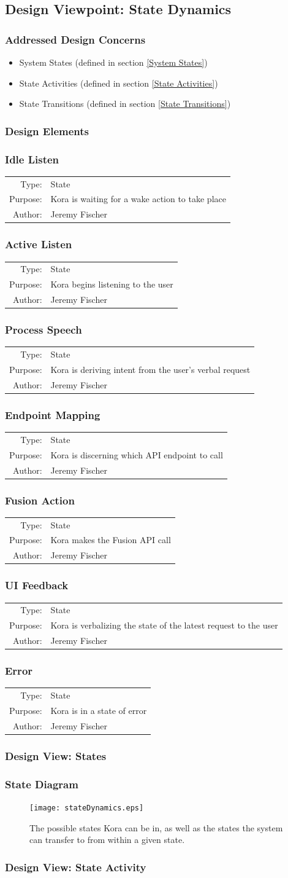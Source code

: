 \documentclass[onecolumn, draftclsnofoot,10pt, compsoc]{IEEEtran}
\def \botname{Kora\xspace}
\newcommand{\designConcernRef}[1]{
    #1 (defined in section \ref{#1})
}
\newcommand{\designElementDef}[4]{
    \subsubsection{#1}\label{#1}
        \begin{tabular}[t]{r p{6in}}
            Type: & #2 \\
            Purpose: & #3 \\
            Author: & #4 \\
        \end{tabular}
}
\begin{document}
	\subsection{Design Viewpoint: State Dynamics}
	\subsubsection{Addressed Design Concerns}
	\begin{itemize}
		\item \designConcernRef{System States}
		\item \designConcernRef{State Activities}
		\item \designConcernRef{State Transitions}
	\end{itemize}

	\subsubsection{Design Elements}
	\designElementDef{Idle Listen}{State}{\botname is waiting for a wake action to take place}{Jeremy Fischer}
	\designElementDef{Active Listen}{State}{\botname begins listening to the user}{Jeremy Fischer}
	\designElementDef{Process Speech}{State}{\botname is deriving intent from the user's verbal request}{Jeremy Fischer}
	\designElementDef{Endpoint Mapping}{State}{\botname is discerning which API endpoint to call}{Jeremy Fischer}
	\designElementDef{Fusion Action}{State}{\botname makes the Fusion API call}{Jeremy Fischer}
	\designElementDef{UI Feedback}{State}{\botname is verbalizing the state of the latest request to the user}{Jeremy Fischer}
	\designElementDef{Error}{State}{\botname is in a state of error}{Jeremy Fischer}


	\subsubsection{Design View: States}
	\subsubsection{State Diagram}
	\begin{figure}[H]
		\texttt{[image: stateDynamics.eps]}
		\centering
		\caption{The possible states \botname can be in, as well as the states the system can transfer to from within a given state.}
		\label{fig::stateD}
	\end{figure}

	\subsubsection{Design View: State Activity}
\end{document}
